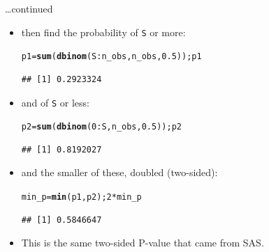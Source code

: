 \documentclass[unknownkeysallowed]{beamer}\usepackage[]{graphicx}\usepackage[]{color}
\makeatletter
\newcommand{\hlnum}[1]{\textcolor[rgb]{0.686,0.059,0.569}{#1}}%
\newcommand{\hlopt}[1]{\textcolor[rgb]{0,0,0}{#1}}%
\newcommand{\hlstd}[1]{\textcolor[rgb]{0.345,0.345,0.345}{#1}}%
\newcommand{\hlkwb}[1]{\textcolor[rgb]{0.69,0.353,0.396}{#1}}%
\newcommand{\hlkwd}[1]{\textcolor[rgb]{0.737,0.353,0.396}{\textbf{#1}}}%
\newenvironment{kframe}{%
 \def\at@end@of@kframe{}%
 \ifinner\ifhmode%
  \def\at@end@of@kframe{\end{minipage}}%
  \begin{minipage}{\columnwidth}%
 \fi\fi%
 \def\FrameCommand##1{\hskip\@totalleftmargin \hskip-\fboxsep
 \colorbox{shadecolor}{##1}\hskip-\fboxsep
     \hskip-\linewidth \hskip-\@totalleftmargin \hskip\columnwidth}%
 \MakeFramed {\advance\hsize-\width
   \@totalleftmargin\z@ \linewidth\hsize
   \@setminipage}}%
 {\par\unskip\endMakeFramed%
 \at@end@of@kframe}
\newenvironment{knitrout}{}{} %
\makeatother
\begin{document}
\begin{frame}[fragile]{\ldots continued}
  \begin{itemize}
\item then find the probability of \texttt{S} or more:
\begin{knitrout}
\color{fgcolor}\begin{kframe}
\begin{alltt}
\hlstd{p1}\hlkwb{=}\hlkwd{sum}\hlstd{(}\hlkwd{dbinom}\hlstd{(S}\hlopt{:}\hlstd{n_obs,n_obs,}\hlnum{0.5}\hlstd{)) ; p1}
\end{alltt}
\begin{verbatim}
## [1] 0.2923324
\end{verbatim}
\end{kframe}
\end{knitrout}

\item and  of \texttt{S} or less:
  
\begin{knitrout}
\color{fgcolor}\begin{kframe}
\begin{alltt}
\hlstd{p2}\hlkwb{=}\hlkwd{sum}\hlstd{(}\hlkwd{dbinom}\hlstd{(}\hlnum{0}\hlopt{:}\hlstd{S,n_obs,}\hlnum{0.5}\hlstd{)) ; p2}
\end{alltt}
\begin{verbatim}
## [1] 0.8192027
\end{verbatim}
\end{kframe}
\end{knitrout}

\item and the smaller of these, doubled (two-sided):
  
\begin{knitrout}
\color{fgcolor}\begin{kframe}
\begin{alltt}
\hlstd{min_p}\hlkwb{=}\hlkwd{min}\hlstd{(p1,p2) ;} \hlnum{2}\hlopt{*}\hlstd{min_p}
\end{alltt}
\begin{verbatim}
## [1] 0.5846647
\end{verbatim}
\end{kframe}
\end{knitrout}

\item This is the same two-sided P-value that came from SAS.
  \end{itemize}
\end{frame}
\end{document}

